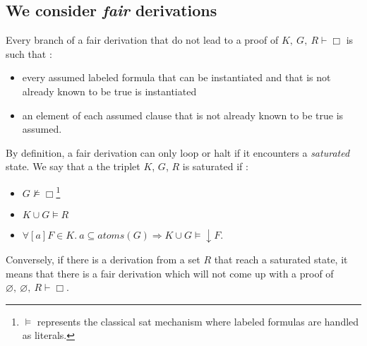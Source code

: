 \documentclass[a4paper,10pt]{article}
\newcommand{\atoms}{\mathit{atoms}}
\newcommand{\gen}{\vdash}
\begin{document}
\subsection{We consider \emph{fair} derivations}
Every branch of a fair derivation that do not lead to a proof of $K,\ G,\ R\gen\Box$ is such that :
\begin{itemize}
 \item every assumed labeled formula that can be instantiated and that is
not already known to be true is instantiated
 \item an element of each assumed clause that is not already known to be true is assumed.
\end{itemize}
By definition, a fair derivation can only loop or halt if it encounters a \emph{saturated} state.
We say that a the triplet $K$, $G$, $R$ is saturated if :
\begin{itemize}
 \item $G\nvDash\Box$\footnote{$\vDash$ represents the classical sat mechanism where labeled
formulas are handled as literals.}
 \item $K\cup G\vDash R$
 \item $\forall [a]F\in K.\ a\subseteq\atoms(G)\Rightarrow K\cup G\vDash\downarrow F$.
\end{itemize}
Conversely,
if there is a derivation from a set $R$ that reach a saturated state, it means that there
is a fair derivation which will not come up with a proof of $\varnothing,\ \varnothing,\ R\gen\Box$.
\end{document}
